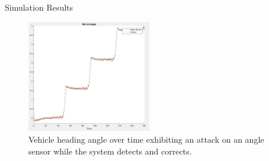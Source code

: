 \begin{section}{Simulation Results}
\begin{figure}
\vspace{1pt}
\centering
\includegraphics[width=0.48\textwidth]{ang_t.png}
\caption{Vehicle heading angle over time exhibiting an attack on an angle sensor while the system detects and corrects.}
\label{fig:ang_t}
\end{figure}

\end{section}